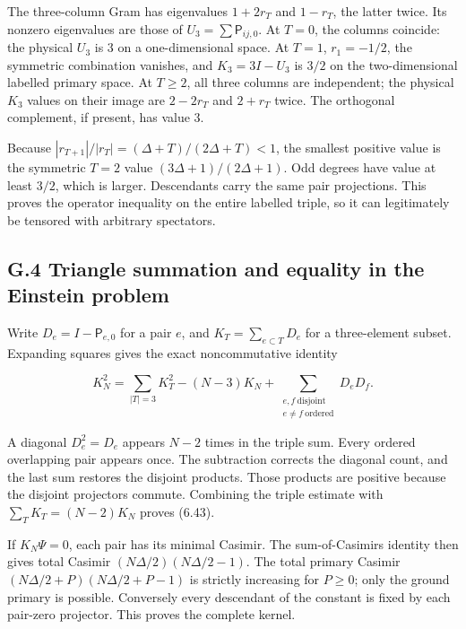 \documentclass[a4paper,11pt]{article}
\numberwithin{equation}{section}
\begin{document}
The three-column Gram has eigenvalues \(1+2r_T\) and \(1-r_T\), the latter twice. Its nonzero eigenvalues are those of \(U_3=\sum\mathsf P_{ij,0}\). At \(T=0\), the columns coincide: the physical \(U_3\) is 3 on a one-dimensional space. At \(T=1\), \(r_1=-1/2\), the symmetric combination vanishes, and \(K_3=3I-U_3\) is \(3/2\) on the two-dimensional labelled primary space. At \(T\ge2\), all three columns are independent; the physical \(K_3\) values on their image are \(2-2r_T\) and \(2+r_T\) twice. The orthogonal complement, if present, has value 3.

Because \(|r_{T+1}|/|r_T|=(\Delta+T)/(2\Delta+T)<1\), the smallest positive value is the symmetric \(T=2\) value \((3\Delta+1)/(2\Delta+1)\). Odd degrees have value at least \(3/2\), which is larger. Descendants carry the same pair projections. This proves the operator inequality on the entire labelled triple, so it can legitimately be tensored with arbitrary spectators.

\hypertarget{g.4-triangle-summation-and-equality-in-the-einstein-problem}{%
\subsection{G.4 Triangle summation and equality in the Einstein problem}\label{g.4-triangle-summation-and-equality-in-the-einstein-problem}}

Write \(D_e=I-\mathsf P_{e,0}\) for a pair \(e\), and \(K_T=\sum_{e\subset T}D_e\) for a three-element subset. Expanding squares gives the exact noncommutative identity

\[
K_N^2=\sum_{|T|=3}K_T^2-(N-3)K_N
+\sum_{\substack{e,f\ \mathrm{disjoint}\\ e\ne f\ \mathrm{ordered}}}D_eD_f.
\tag{G.9}
\]

A diagonal \(D_e^2=D_e\) appears \(N-2\) times in the triple sum. Every ordered overlapping pair appears once. The subtraction corrects the diagonal count, and the last sum restores the disjoint products. Those products are positive because the disjoint projectors commute. Combining the triple estimate with \(\sum_TK_T=(N-2)K_N\) proves (6.43).

If \(K_N\Psi=0\), each pair has its minimal Casimir. The sum-of-Casimirs identity then gives total Casimir \((N\Delta/2)(N\Delta/2-1)\). The total primary Casimir \((N\Delta/2+P)(N\Delta/2+P-1)\) is strictly increasing for \(P\ge0\); only the ground primary is possible. Conversely every descendant of the constant is fixed by each pair-zero projector. This proves the complete kernel.
\end{document}
